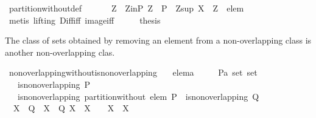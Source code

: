 \begin{isabellebody}
\ partition{\isacharunderscore}without{\isacharunderscore}def\ \isacommand{{\isachardot}}\isamarkupfalse%
\isanewline
\ \ \isamarkupfalse%
\ \isamarkupfalse%
\ Z\ \ Z{\isacharunderscore}in{\isacharunderscore}P{\isacharcolon}\ {\isachardoublequoteopen}Z\ {\isasymin}\ P{\isachardoublequoteclose}\ \ Z{\isacharunderscore}sup{\isacharcolon}\ {\isachardoublequoteopen}X\ {\isacharequal}\ Z\ {\isacharminus}\ {\isacharbraceleft}elem{\isacharbraceright}{\isachardoublequoteclose}\isanewline
\ \ \ \ \isamarkupfalse%
\ {\isacharparenleft}metis\ {\isacharparenleft}lifting{\isacharparenright}\ Diff{\isacharunderscore}iff\ image{\isacharunderscore}iff{\isacharparenright}\isanewline
\ \ \isamarkupfalse%
\ \isamarkupfalse%
\ {\isacharquery}thesis\ \isacommand{{\isachardot}{\isachardot}}\isamarkupfalse%
\isanewline
{}\isamarkupfalse%
%
\endisatagproof
{\isafoldproof}%
%
\isadelimproof
%
\endisadelimproof
%
\begin{isamarkuptext}%
The class of sets obtained by removing an element from a non-overlapping class is another
  non-overlapping clas.%
\end{isamarkuptext}%
\isamarkuptrue%
\isamarkupfalse%
\ non{\isacharunderscore}overlapping{\isacharunderscore}without{\isacharunderscore}is{\isacharunderscore}non{\isacharunderscore}overlapping{\isacharcolon}\isanewline
\ \ \ elem{\isacharcolon}{\isacharcolon}{\isacharprime}a\isanewline
\ \ \ \ \ P{\isacharcolon}{\isacharcolon}{\isachardoublequoteopen}{\isacharprime}a\ set\ set{\isachardoublequoteclose}\isanewline
\ \ \ {\isachardoublequoteopen}is{\isacharunderscore}non{\isacharunderscore}overlapping\ P{\isachardoublequoteclose}\isanewline
\ \ \ {\isachardoublequoteopen}is{\isacharunderscore}non{\isacharunderscore}overlapping\ {\isacharparenleft}partition{\isacharunderscore}without\ elem\ P{\isacharparenright}{\isachardoublequoteclose}\ {\isacharparenleft}\ {\isachardoublequoteopen}is{\isacharunderscore}non{\isacharunderscore}overlapping\ {\isacharquery}Q{\isachardoublequoteclose}{\isacharparenright}\isanewline
%
\isadelimproof
%
\endisadelimproof
%
\isatagproof
{}\isamarkupfalse%
\ {\isacharminus}\ \ \ \isanewline
\ \ \isamarkupfalse%
\ {\isachardoublequoteopen}{\isasymforall}\ X{}\ {\isasymin}\ {\isacharquery}Q{\isachardot}\ {\isasymforall}\ X{}\ {\isasymin}\ {\isacharquery}Q{\isachardot}\ X{}\ {\isasyminter}\ X{}\ {\isasymnoteq}\ {\isacharbraceleft}{\isacharbraceright}\ {\isasymlongleftrightarrow}\ X{}\ {\isacharequal}\ X{}{\isachardoublequoteclose}\isanewline

\end{isabellebody}
